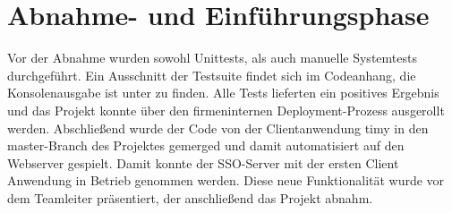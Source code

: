 \section{Abnahme- und Einführungsphase} 
\label{sec:AbnahmeEinfuehrung}

Vor der Abnahme wurden sowohl Unittests, als auch manuelle Systemtests durchgeführt. Ein Ausschnitt der Testsuite findet sich im Codeanhang, die Konsolenausgabe ist unter  zu finden.
Alle Tests  lieferten ein positives Ergebnis und das Projekt konnte über den firmeninternen Deployment-Prozess ausgerollt werden.
Abschließend wurde der Code von der Clientanwendung timy in den master-Branch des Projektes gemerged und damit automatisiert auf den Webserver gespielt.
Damit konnte der \ac{SSO}-Server mit der ersten Client Anwendung in Betrieb genommen werden. 
Diese neue Funktionalität wurde vor dem Teamleiter präsentiert, der anschließend das Projekt abnahm.
